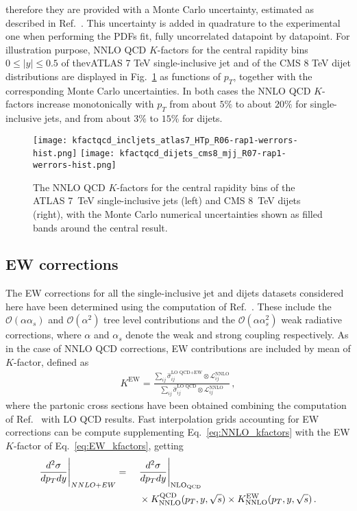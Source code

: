 therefore they are provided with a Monte Carlo uncertainty, estimated as described in Ref.~\cite{Ridder:2016rzm}.
This uncertainty is added in quadrature to the experimental one when performing the PDFs fit, fully uncorrelated datapoint 
by datapoint.
For illustration purpose, NNLO QCD $K$-factors for the central rapidity bins $0\leq |y| \leq 0.5$
of thevATLAS 7 TeV single-inclusive jet and of the CMS 8 TeV dijet distributions are displayed 
in Fig.~\ref{fig:kfactqcd_werrors} as functions of $p_T$, together with the corresponding Monte Carlo uncertainties.
In both cases the NNLO QCD $K$-factors increase monotonically with $p_T$ from about $5\%$ to about $20\%$ for single-inclusive
jets, and from about $3\%$ to $15\%$ for dijets. 
\begin{figure}[!t]
    \centering
    \texttt{[image: kfactqcd\_incljets\_atlas7\_HTp\_R06-rap1-werrors-hist.png]}
    \texttt{[image: kfactqcd\_dijets\_cms8\_mjj\_R07-rap1-werrors-hist.png]}
    \caption{The NNLO QCD $K$-factors for the central rapidity bins of the ATLAS 
       7~TeV single-inclusive jets (left) and CMS 8~TeV dijets (right), with
       the Monte Carlo numerical uncertainties shown as filled bands around the 
       central result.}
\label{fig:kfactqcd_werrors} 
\end{figure}

\subsection{EW corrections}
The EW corrections for all the single-inclusive jet and dijets datasets considered here have been determined 
using the computation of Ref.~\cite{Dittmaier:2012kx}.
These include the $\mathcal{O}\left(\alpha\alpha_s\right)$ and $\mathcal{O}\left(\alpha^2\right)$ tree level contributions 
and the $\mathcal{O}\left(\alpha\alpha_s^2\right)$ weak radiative corrections, where $\alpha$ and $\alpha_s$
denote the weak and strong coupling respectively.
As in the case of NNLO QCD corrections, EW contributions are included by mean of $K$-factor, defined as
\begin{align}
    \label{eq:EW_kfactors}
    K^{\text{EW}} = \frac{\sum_{ij}\hat{\sigma}_{ij}^{\text{LO QCD}+\text{EW}}\otimes \mathcal{L}_{ij}^{\text{NNLO}}}
    {\sum_{ij}\hat{\sigma}_{ij}^{\text{LO QCD}}\otimes \mathcal{L}_{ij}^{\text{NNLO}}}\,,
\end{align}
where the partonic cross sections have been obtained combining the computation of Ref.~\cite{Dittmaier:2012kx} 
with LO QCD results.
Fast interpolation grids accounting for EW corrections can be compute
supplementing Eq.~\ref{eq:NNLO_kfactors} with the EW $K$-factor of Eq.~\ref{eq:EW_kfactors}, getting
\begin{align}
    \label{eq:NNLO_EW_kfactors}
    \frac{d^2\sigma}{dp_T dy}\Bigg|_{NNLO+EW} =\,\,\,\,\,\,\,\, &\frac{d^2\sigma}{dp_T dy} 
    \Bigg|_{\rm NLO_{QCD}} \nonumber\\ &\times K_{\rm NNLO}^{\rm QCD}(p_T,y,\sqrt{s})
    \times K_{\rm NNLO}^{\rm EW}(p_T,y,\sqrt{s})\,.
\end{align}

